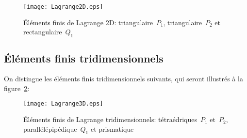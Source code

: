 \begin{figure}[ht]
\centering
\texttt{[image: Lagrange2D.eps]}
\caption{\label{Lagrange2D} Éléments finis de Lagrange 2D: triangulaire~$P_1$, triangulaire~$P_2$ et rectangulaire~$Q_1$}
\end{figure}

\medskip
\subsection*{Éléments finis tridimensionnels}

On distingue les éléments finis tridimensionnels suivants, qui seront illustrés à la figure~\ref{Lagrange3D}:
\begin{figure}[ht]
\centering
\texttt{[image: Lagrange3D.eps]}
\caption{Éléments finis de Lagrange tridimensionnels: tétraédriques~$P_1$ et~$P_2$, parallélépipédique~$Q_1$ et prismatique}\label{Lagrange3D}
\end{figure}
